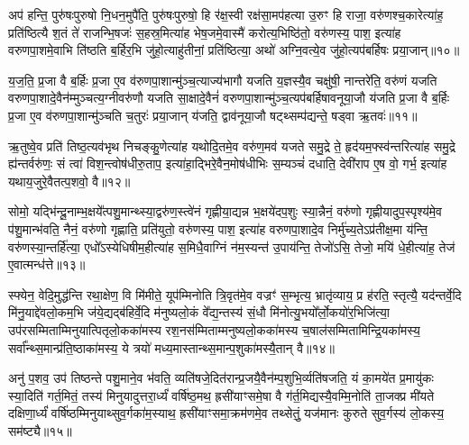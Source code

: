 अप॑ हन्ति॒ पुरु॑षःपुरुषो नि॒धन॒मुपै॑ति॒ पुरु॑षःपुरुषो॒ हि र॑क्ष॒स्वी रक्ष॑सा॒मप॑हत्या उ॒रुꣳ हि राजा॒ वरु॑णश्च॒कारेत्या॑ह॒ प्रति॑ष्ठित्यै श॒तं ते॑ राजन्भि॒षजः॑ स॒हस्र॒मित्या॑ह भेष॒जमे॒वास्मै॑ करोत्य॒भिष्ठि॑तो॒ वरु॑णस्य॒ पाश॒ इत्या॑ह वरुणपा॒शमे॒वाभि ति॑ष्ठति ब॒र्\mbox{}हिर॒भि जु॑हो॒त्याहु॑तीनां॒ प्रति॑ष्ठित्या॒ अथो॑ अग्नि॒वत्ये॒व जु॑हो॒त्यप॑बर्\mbox{}हिषः प्रया॒जान्॥१०॥

य॒ज॒ति॒ प्र॒जा वै ब॒र्\mbox{}हिः प्र॒जा ए॒व व॑रुणपा॒शान्मु॑ञ्च॒त्याज्य॑भागौ यजति य॒ज्ञस्यै॒व चक्षु॑षी॒ नान्तरे॑ति॒ वरु॑णं यजति वरुणपा॒शादे॒वैन॑म्मुञ्चत्य॒ग्नीवरु॑णौ यजति सा॒क्षादे॒वैनं॑ वरुणपा॒शान्मु॑ञ्च॒त्यप॑बर्\mbox{}हिषावनूया॒जौ य॑जति प्र॒जा वै ब॒र्\mbox{}हिः प्र॒जा ए॒व व॑रुणपा॒शान्मु॑ञ्चति च॒तुरः॑ प्रया॒जान् य॑जति॒ द्वाव॑नूया॒जौ षट्थ्सम्प॑द्यन्ते॒ षड्वा ऋ॒तवः॑॥११॥

ऋ॒तुष्वे॒व प्रति॑ तिष्ठ॒त्यव॑भृथ निचङ्कु॒णेत्या॑ह यथोदि॒तमे॒व वरु॑ण॒मव॑ यजते समु॒द्रे ते॒ हृद॑यम॒फ्स्व॑न्तरित्या॑ह समु॒द्रे ह्य॑न्तर्वरु॑णः॒ सं त्वा॑ विश॒न्त्वोष॑धीरु॒ताप॒ इत्या॑हा॒द्भिरे॒वैन॒मोष॑धीभिः स॒म्यञ्चं॑ दधाति॒ देवी॑राप ए॒ष वो॒ गर्भ॒ इत्या॑ह यथाय॒जुरे॒वैतत्प॒शवो॒ वै॥१२॥

सोमो॒ यद्भि॑न्दू॒नाम्भ॒क्षये᳚त्पशु॒मान्थ्स्या॒द्वरु॑ण॒स्त्वे॑नं गृह्णीया॒द्यन्न भ॒क्षये॑दप॒शुः स्या॒न्नैनं॒ वरु॑णो गृह्णीयादुप॒स्पृश्य॑मे॒व प॑शु॒मान्भ॑वति॒ नैनं॒ वरु॑णो गृह्णाति॒ प्रति॑युतो॒ वरु॑णस्य॒ पाश॒ इत्या॑ह वरुणपा॒शादे॒व निर्मु॑च्य॒ते\-ऽप्र॑तीक्ष॒मा य॑न्ति॒ वरु॑णस्या॒न्तर्\mbox{}हि॑त्या॒ एधो᳚\-ऽस्येधिषीम॒हीत्या॑ह स॒मिधै॒वाग्निं न॑म॒स्यन्त॑ उ॒पाय॑न्ति॒ तेजो॑\-ऽसि॒ तेजो॒ मयि॑ धे॒हीत्या॑ह॒ तेज॑ ए॒वात्मन्ध॑त्ते॥१३॥

{\anuvakamend[{रक्षाꣳ॑सि प्रया॒जानृ॒तवो॒ वै न॑म॒स्यन्तो॒ द्वाद॑श च॥३॥}]}

स्फ्येन॒ वेदि॒मुद्ध॑न्ति रथा॒क्षेण॒ वि मि॑मीते॒ यूप॑म्मिनोति त्रि॒वृत॑मे॒व वज्रꣳ॑ स॒म्भृत्य॒ भ्रातृ॑व्याय॒ प्र ह॑रति॒ स्तृत्यै॒ यद॑न्तर्वे॒दि मि॑नु॒याद्दे॑वलो॒कम॒भि ज॑ये॒द्यद्ब॑हिर्वे॒दि म॑नुष्यलो॒कं वे᳚द्य॒न्तस्य॑ सं॒धौ मि॑नोत्यु॒भयो᳚र्लो॒कयो॑र॒भिजि॑त्या॒ उप॑रसम्मिताम्मिनुयात्पितृलो॒कका॑मस्य रश॒नस॑म्मिताम्मनुष्यलो॒कका॑मस्य च॒षाल॑सम्मितामिन्द्रि॒यका॑मस्य॒ सर्वा᳚न्थ्स॒मान्प्र॑ति॒ष्ठाका॑मस्य॒ ये त्रयो॑ मध्य॒मास्तान्थ्स॒मान्प॒शुका॑मस्यै॒तान् वै॥१४॥

अनु॑ प॒शव॒ उप॑ तिष्ठन्ते पशु॒माने॒व भ॑वति॒ व्यति॑षजे॒दित॑रान्प्र॒जयै॒वैन॑म्प॒शुभि॒र्व्यति॑षजति॒ यं का॒मये॑त प्र॒मायु॑कः स्या॒दिति॑ गर्त॒मितं॒ तस्य॑ मिनुयादुत्तरा॒र्ध्यं॑ वर्\mbox{}षि॑ष्ठ॒मथ॒ ह्रसी॑याꣳसमे॒षा वै ग॑र्त॒मिद्यस्यै॒वम्मि॒नोति॑ ता॒जक्प्र मी॑यते दक्षिणा॒र्ध्यं॑ वर्\mbox{}षि॑ष्ठम्मिनुयाथ्सुव॒र्गका॑म॒स्याथ॒ ह्रसी॑याꣳसमा॒क्रम॑णमे॒व तथ्सेतुं॒ यज॑मानः कुरुते सुव॒र्गस्य॑ लो॒कस्य॒ सम॑ष्ट्यै॥१५॥

